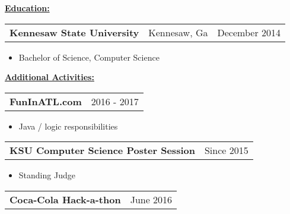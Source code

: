 \documentclass{book}
\newenvironment{myitemize}
{ \begin{itemize}
	\setlength{\itemsep}{0pt}
	\setlength{\parskip}{0pt}
	\setlength{\parsep}{0pt}     }
{ \end{itemize}                  }
\begin{document}
\underline{\Large {\bfseries Education:}}

\enspace

\begin{tabular}{L{3in}L{1.75in}R{1.75in}}

	{\large {\bfseries Kennesaw State University}} & Kennesaw, Ga & December 2014 \\%

\end{tabular}

\begin{myitemize}

	\item Bachelor of Science, Computer Science 

\end{myitemize}

\underline{\Large {\bfseries Additional Activities:}}

\enspace

\begin{tabular}{L{4.75in}R{1.75in}}

	{\large {\bfseries FunInATL.com}} & 2016 - 2017\\

\end{tabular}

	\vspace{-\topsep}
	\begin{myitemize}

		\item Java / logic responsibilities

	\end{myitemize} 

\begin{tabular}{L{4.75in}R{1.75in}}

	{\large {\bfseries KSU Computer Science Poster Session}} & Since 2015 \\

\end{tabular}

	\vspace{-\topsep}
	\begin{myitemize}

		\item Standing Judge

	\end{myitemize} 

\begin{tabular}{L{4.75in}R{1.75in}}

	{\large {\bfseries Coca-Cola Hack-a-thon}} & June 2016 \\

\end{tabular}
\end{document}
